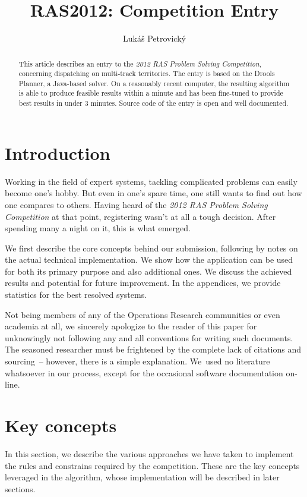 \documentclass[10pt,a4paper,final]{article}
\author{Lukáš Petrovický}
\title{RAS2012: Competition Entry}
\begin{document}
\maketitle

\begin{abstract}
This article describes an entry to the \emph{2012 RAS Problem Solving Competition}, concerning dispatching on multi-track territories. The entry is based on the Drools Planner, a Java-based solver. On a reasonably recent computer, the resulting algorithm is able to produce feasible results within a minute and has been fine-tuned to provide best results in under 3 minutes. Source code of the entry is open and well documented.
\end{abstract}

\section{Introduction}

Working in the field of expert systems, tackling complicated problems can easily become one's hobby. But even in one's spare time, one still wants to find out how one compares to others. Having heard of the \emph{2012 RAS Problem Solving Competition} at that point, registering wasn't at all a tough decision. After spending many a night on it, this is what emerged.

We first describe the core concepts behind our submission, following by notes on the actual technical implementation. We show how the application can be used for both its primary purpose and also additional ones. We discuss the achieved results and potential for future improvement. In the appendices, we provide statistics for the best resolved systems.

Not being members of any of the Operations Research communities or even academia at all, we sincerely apologize to the reader of this paper for unknowingly not following any and all conventions for writing such documents. The seasoned researcher must be frightened by the complete lack of citations and sourcing~-- however, there is a simple explanation. We~used no literature whatsoever in our process, except for the occasional software documentation on-line.

\section{Key concepts}

In this section, we describe the various approaches we have taken to implement the rules and constrains required by the competition. These are the key concepts leveraged in the algorithm, whose implementation will be described in later sections.
\end{document}
